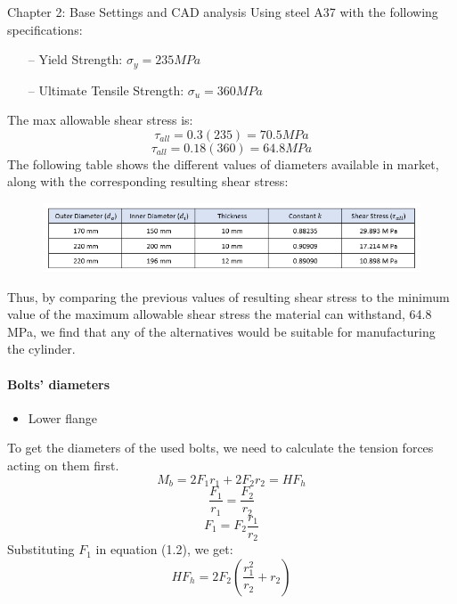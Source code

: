 \documentclass{book}
\begin{document}
\begin{chapter}{Chapter 2: Base Settings and CAD analysis}
Using steel A37 with the following specifications:
\begin{itemize}
	\item[--] Yield Strength: $\sigma_{y} = 235 MPa$
	\item[--] Ultimate Tensile Strength: $\sigma_{u} = 360 MPa$
\end{itemize}

The max allowable shear stress is:
$$ \tau_{all} = 0.3 (235) = 70.5 MPa $$
$$ \tau_{all} = 0.18 (360) = 64.8 MPa $$
\vspace{0.3 cm}
\newline The following table shows the different values of diameters available in market, along with the corresponding resulting shear stress:
\begin{figure}[H]
	\begin{center}
		\includegraphics[scale = 0.95]{CalculationsResults}
	\end{center}	
\end{figure}

Thus, by comparing the previous values of resulting shear stress to the minimum value of the maximum allowable shear stress the material can withstand, 64.8 MPa, we find that any of the alternatives would be suitable for manufacturing the cylinder.

\bigskip

\paragraph{Bolts’ diameters}
\begin{itemize}
	\item Lower flange
\end{itemize}

To get the diameters of the used bolts, we need to calculate the tension forces acting on them first. 
\begin{equation}
M_{b} = 2 F_{1} r_{1} + 2 F_{2} r_{2} = H F_{h}
\end{equation}
$$\frac{F_{1}}{r_{1}} = \frac{F_{2}}{r_{2}}$$
$$ F_{1} = F_{2} \frac{r_{1}}{r_{2}}$$
Substituting $F_{1}$ in equation (1.2), we get:
\begin{equation}
H F_{h} = 2 F_{2} (\frac{r_{1}^{2}}{r_{2}} + r_{2})
\end{equation}


\end{chapter}
\end{document}

